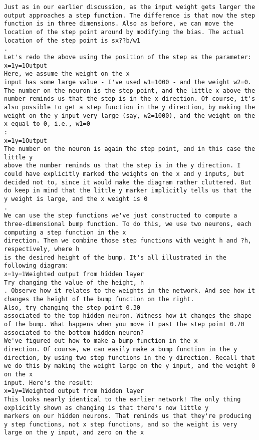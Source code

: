 \begin{lstlisting}
Just as in our earlier discussion, as the input weight gets larger the output approaches a step function. The difference is that now the step function is in three dimensions. Also as before, we can move the location of the step point around by modifying the bias. The actual location of the step point is sx??b/w1
.
Let's redo the above using the position of the step as the parameter:
x=1y=1Output
Here, we assume the weight on the x
input has some large value - I've used w1=1000 - and the weight w2=0. The number on the neuron is the step point, and the little x above the number reminds us that the step is in the x direction. Of course, it's also possible to get a step function in the y direction, by making the weight on the y input very large (say, w2=1000), and the weight on the x equal to 0, i.e., w1=0
:
x=1y=1Output
The number on the neuron is again the step point, and in this case the little y
above the number reminds us that the step is in the y direction. I could have explicitly marked the weights on the x and y inputs, but decided not to, since it would make the diagram rather cluttered. But do keep in mind that the little y marker implicitly tells us that the y weight is large, and the x weight is 0
.
We can use the step functions we've just constructed to compute a three-dimensional bump function. To do this, we use two neurons, each computing a step function in the x
direction. Then we combine those step functions with weight h and ?h, respectively, where h
is the desired height of the bump. It's all illustrated in the following diagram:
x=1y=1Weighted output from hidden layer
Try changing the value of the height, h
. Observe how it relates to the weights in the network. And see how it changes the height of the bump function on the right.
Also, try changing the step point 0.30
associated to the top hidden neuron. Witness how it changes the shape of the bump. What happens when you move it past the step point 0.70
associated to the bottom hidden neuron?
We've figured out how to make a bump function in the x
direction. Of course, we can easily make a bump function in the y direction, by using two step functions in the y direction. Recall that we do this by making the weight large on the y input, and the weight 0 on the x
input. Here's the result:
x=1y=1Weighted output from hidden layer
This looks nearly identical to the earlier network! The only thing explicitly shown as changing is that there's now little y
markers on our hidden neurons. That reminds us that they're producing y step functions, not x step functions, and so the weight is very large on the y input, and zero on the x

\end{lstlisting}

